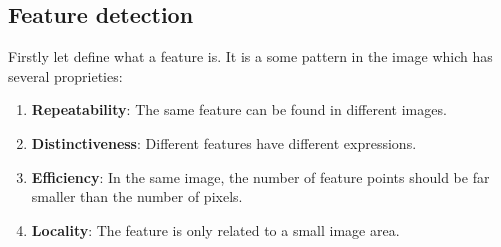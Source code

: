\subsection{Feature detection}
Firstly let define what a feature is. It is a some pattern in the image which has several proprieties:
\begin{enumerate}
    \item {\bf Repeatability}: The same feature can be found in different images.
    \item {\bf Distinctiveness}: Different features have different expressions.
    \item {\bf Efficiency}: In the same image, the number of feature points should be far smaller than the number of pixels.
    \item {\bf Locality}: The feature is only related to a small image area.
\end{enumerate}

